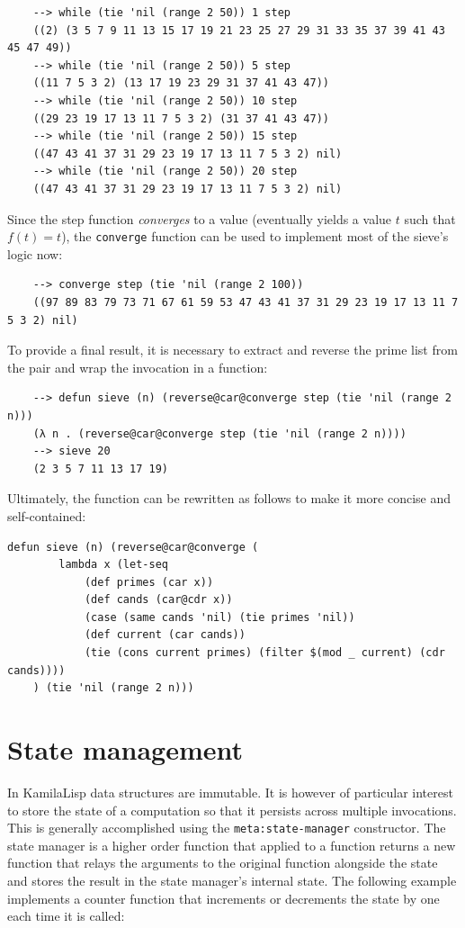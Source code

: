 \begin{Verbatim}
    --> while (tie 'nil (range 2 50)) 1 step
    ((2) (3 5 7 9 11 13 15 17 19 21 23 25 27 29 31 33 35 37 39 41 43 45 47 49))
    --> while (tie 'nil (range 2 50)) 5 step
    ((11 7 5 3 2) (13 17 19 23 29 31 37 41 43 47))
    --> while (tie 'nil (range 2 50)) 10 step
    ((29 23 19 17 13 11 7 5 3 2) (31 37 41 43 47))
    --> while (tie 'nil (range 2 50)) 15 step
    ((47 43 41 37 31 29 23 19 17 13 11 7 5 3 2) nil)
    --> while (tie 'nil (range 2 50)) 20 step
    ((47 43 41 37 31 29 23 19 17 13 11 7 5 3 2) nil)
\end{Verbatim}

Since the step function \textit{converges} to a value (eventually yields a value $t$ such that $f(t) = t$), the \verb|converge| function can be used to implement most of the sieve's logic now:

\begin{Verbatim}
    --> converge step (tie 'nil (range 2 100))
    ((97 89 83 79 73 71 67 61 59 53 47 43 41 37 31 29 23 19 17 13 11 7 5 3 2) nil)
\end{Verbatim}

To provide a final result, it is necessary to extract and reverse the prime list from the pair and wrap the invocation in a function:

\begin{Verbatim}
    --> defun sieve (n) (reverse@car@converge step (tie 'nil (range 2 n)))
    (λ n . (reverse@car@converge step (tie 'nil (range 2 n))))
    --> sieve 20
    (2 3 5 7 11 13 17 19)
\end{Verbatim}

Ultimately, the function can be rewritten as follows to make it more concise and self-contained:

\begin{Verbatim}
defun sieve (n) (reverse@car@converge (
        lambda x (let-seq
            (def primes (car x))
            (def cands (car@cdr x))
            (case (same cands 'nil) (tie primes 'nil))
            (def current (car cands))
            (tie (cons current primes) (filter $(mod _ current) (cdr cands))))
    ) (tie 'nil (range 2 n)))
\end{Verbatim}

\section{State management}

In KamilaLisp data structures are immutable. It is however of particular interest to store the state of a computation so that it persists across multiple invocations. This is generally accomplished using the \verb|meta:state-manager| constructor. The state manager is a higher order function that applied to a function returns a new function that relays the arguments to the original function alongside the state and stores the result in the state manager's internal state. The following example implements a counter function that increments or decrements the state by one each time it is called:

